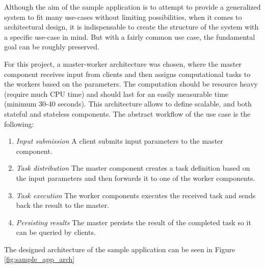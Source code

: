 Although the aim of the sample application is to attempt to provide a generalized system to fit many use-cases without limiting possibilities, when it comes to architectural design, it is indispensable to create the structure of the system with a specific use-case in mind. But with a fairly common use case, the fundamental goal can be roughly preserved.

For this project, a master-worker architecture was chosen, where the master component receives input from clients and then assigns computational tasks to the workers based on the parameters. The computation should be resource heavy (\eg require much CPU time) and should last for an easily measurable time (minimum 30-40 seconds). This architecture allows to define scalable, and both stateful and stateless components. The abstract workflow of the use case is the following:


\begin{enumerate}
	\item \emph{Input submission} A client submits input parameters to the master component.
	\item \emph{Task distribution} The master component creates a task definition based on the input parameters and then forwards it to one of the worker components.
	\item \emph{Task execution} The worker components executes the received task and sends back the result to the master.
	\item \emph{Persisting results} The master persists the result of the completed task so it can be queried by clients.
\end{enumerate}

The designed architecture of the sample application can be seen in Figure \ref{fig:sample_app_arch}

